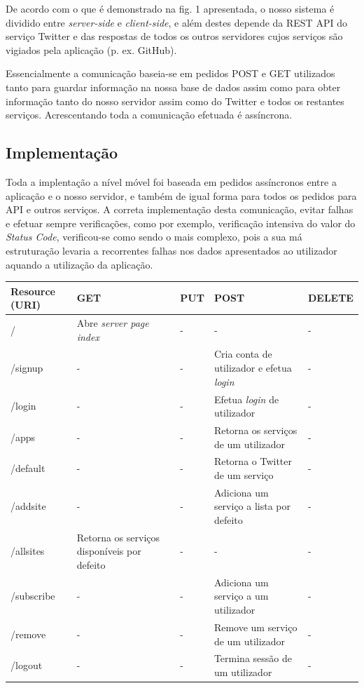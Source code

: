 \documentclass[12pt]{article}
\begin{document}
De acordo com o que é demonstrado na fig. 1 apresentada, o nosso sistema é dividido entre \textit{server-side} e \textit{client-side}, e além destes depende da REST API do serviço Twitter e das respostas de todos os outros servidores cujos serviços são vigiados pela aplicação (p. ex. GitHub).
	
	Essencialmente a comunicação baseia-se em pedidos POST e GET utilizados tanto para guardar informação na nossa base de dados assim como para obter informação tanto do nosso servidor assim como do Twitter e todos os restantes serviços. Acrescentando toda a comunicação efetuada é assíncrona.

\subsection{Implementação}

Toda a implentação a nível móvel foi baseada em pedidos assíncronos entre a aplicação e o nosso servidor, e também de igual forma para todos os pedidos para API e outros serviços. A correta implementação desta comunicação, evitar falhas e efetuar sempre verificações, como por exemplo, verificação intensiva do valor do \textit{Status Code}, verificou-se como sendo o mais complexo, pois a sua má estruturação levaria a recorrentes falhas nos dados apresentados ao utilizador aquando a utilização da aplicação. 

\renewcommand{\arraystretch}{1.5}
\begin{table}[h!]
\begin{tabular}{p{2cm}|p{2.5cm}|p{2.5cm}|p{2.5cm}|p{2cm}}
Resource (URI) & GET  & PUT & POST  & DELETE  \\\hline
/ & Abre \textit{server page index} &  - & - &  - \\\hline
/signup &  -& - & Cria conta de utilizador e efetua \textit{login}  &- \\\hline
/login &-  &-  & Efetua \textit{login} de utilizador & - \\\hline
/apps &  -& - & Retorna os serviços de um utilizador &-  \\\hline
/default & - & - & Retorna o Twitter de um serviço &-  \\\hline
/addsite &  -& - &Adiciona um serviço a lista por defeito &-  \\\hline
/allsites &  Retorna os serviços disponíveis por defeito &-  &- & - \\\hline
/subscribe &-  &  -&Adiciona um serviço a um utilizador& - \\\hline
/remove & - &  -& Remove um serviço de um utilizador & - \\\hline
/logout &  -& - & Termina sessão de um utilizador &-  \\\hline
\end{tabular}
\end{table}
\end{document}
